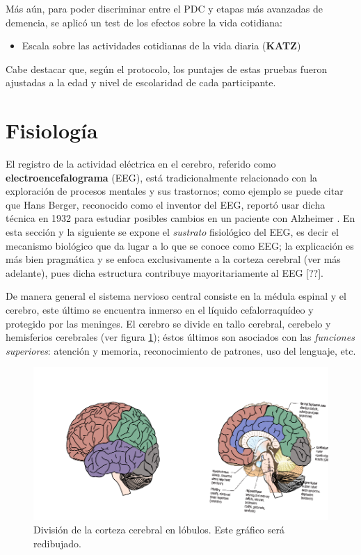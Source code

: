 Más aún, para poder discriminar entre el PDC y etapas más avanzadas de demencia, se aplicó un
test de los efectos sobre la vida cotidiana:
%
\begin{itemize}
\item {Escala sobre las actividades cotidianas de la vida diaria (\textbf{KATZ})} \cite{Roumec14}
\end{itemize}

Cabe destacar que, según el protocolo, los puntajes de estas pruebas fueron ajustadas a la edad y 
nivel de escolaridad de cada participante.


\section{Fisiología}

El registro de la actividad eléctrica en el cerebro, referido como \textbf{electroencefalograma} 
(EEG), está tradicionalmente relacionado con la exploración de procesos mentales y sus trastornos; 
como ejemplo se puede citar que Hans Berger, reconocido como el inventor del EEG, reportó usar 
dicha técnica en 1932 para estudiar posibles cambios en un paciente con Alzheimer 
\cite{historia_eeg}.
%
En esta sección y la siguiente se expone el \textit{sustrato} fisiológico del EEG, es decir el
mecanismo biológico que da lugar a lo que se conoce como EEG; la explicación es más bien
pragmática y se enfoca exclusivamente a la corteza cerebral (ver más adelante), pues dicha 
estructura contribuye mayoritariamente al EEG [??].

De manera general el sistema nervioso central consiste en la médula espinal y el cerebro, este 
último se encuentra inmerso en el líquido cefalorraquídeo y protegido por las meninges.
El cerebro se divide en tallo cerebral, cerebelo y hemisferios cerebrales (ver figura 
\ref{lobulos}); éstos últimos son asociados con las \textit{funciones superiores}: atención y 
memoria, reconocimiento de patrones, uso del lenguaje, etc.

\begin{figure}
\centering
\includegraphics[width=\linewidth]{./img_diagramas/cerebro_zonas.pdf} 
\caption{División de la corteza cerebral en lóbulos.
Este gráfico será redibujado.
}
\label{lobulos}
\end{figure}

